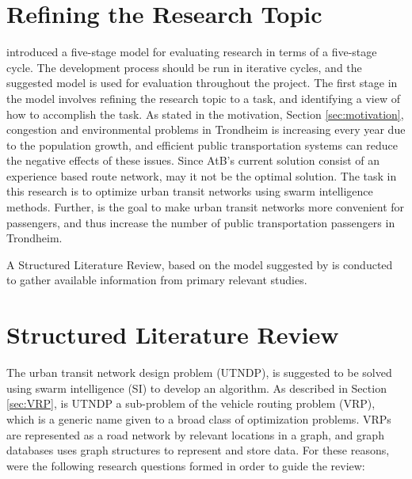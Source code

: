 
\section{Refining the Research Topic}
\label{sec:refiningResearchTopic}
\citet{cohen88} introduced a five-stage model for evaluating research in terms of a five-stage cycle. The development process should be run in iterative cycles, and the suggested model is used for evaluation throughout the project. The first stage in the model involves refining the research topic to a task, and identifying a view of how to accomplish the task. %
As stated in the motivation, Section \vref{sec:motivation}, congestion and environmental problems in Trondheim is increasing every year due to the population growth\citep{website:miljopakken}, and efficient public transportation systems can reduce the negative effects of these issues. Since AtB's\citep{website:atb} current solution consist of an experience based route network, may it not be the optimal solution. The task in this research is to optimize urban transit networks using swarm intelligence methods. Further, is the goal to make urban transit networks more convenient for passengers, and thus increase the number of public transportation passengers in Trondheim. 

A Structured Literature Review, based on the model suggested by \citet{kofod2014} is conducted to gather available information from primary relevant studies.

\section{Structured Literature Review}
\label{sec:structuredLiteratureReview}

The urban transit network design problem (UTNDP), is suggested to be solved using swarm intelligence (SI) to develop an algorithm. As described in Section \vref{sec:VRP}, is UTNDP a sub-problem of the vehicle routing problem (VRP), which is a generic name given to a broad class of optimization problems. VRPs are represented as a road network by relevant locations in a graph, and graph databases uses graph structures to represent and store data. For these reasons, %
were the following research questions formed in order to guide the review:

